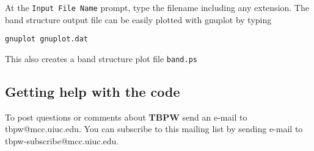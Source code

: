 At the {\tt Input File Name} prompt, type the filename including any
extension. The band structure output file can be easily plotted with
gnuplot by typing
\begin{verbatim}
gnuplot gnuplot.dat
\end{verbatim}
This also creates a band structure plot file {\tt band.ps}

\subsection{Getting help with the code}
To post questions or comments about {\bf TBPW} send an e-mail to
tbpw@mcc.uiuc.edu. You can subscribe to this mailing list by sending
e-mail to tbpw-subscribe@mcc.uiuc.edu.
